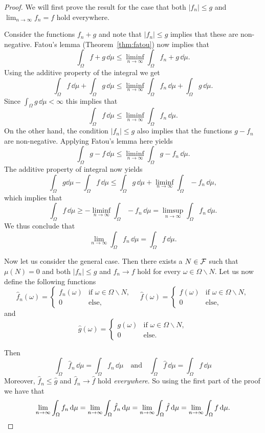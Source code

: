 \begin{proof}
We will first prove the result for the case that both $|f_n| \le g$ and $\lim_{n\to\infty} f_n =f$ hold everywhere.  

Consider the functions $f_n+g$ and note that $|f_n| \le g$ implies that these are non-negative. Fatou's lemma (Theorem~\ref{thm:fatou}) now implies that
\[
	\int_\Omega f + g \, \dd \mu \le \liminf_{n \to \infty} \int_\Omega f_n + g \, \dd \mu.
\] 
Using the additive property of the integral we get
\[
	\int_\Omega f \, \dd \mu + \int_\Omega g \, \dd \mu 
	\le \liminf_{n \to \infty} \int_\Omega f_n \, \dd \mu + \int_\Omega g \, \dd \mu.
\]
Since $\int_\Omega g \, \dd \mu < \infty$ this implies that
\[
	\int_\Omega f \, \dd \mu \le \liminf_{n \to \infty} \int_\Omega f_n \, \dd \mu.
\]
On the other hand, the condition $|f_n| \le g$ also implies that the functions $g - f_n$ are non-negative. Applying Fatou's lemma here yields
\[
	\int_\Omega g - f \, \dd \mu \le \liminf_{n \to \infty} \int_\Omega g - f_n \, \dd \mu.
\]
The additive property of integral now yields
\[
	\int_\Omega g \dd \mu - \int_\Omega f \, \dd \mu \le \int_\Omega g \, \dd \mu 
	+ \liminf_{n \to \infty} \int_\Omega - f_n \, \dd \mu,
\]
which implies that 
\[
	\int_\Omega f \, \dd \mu \ge - \liminf_{n \to \infty} \int_\Omega - f_n \, \dd \mu 
	= \limsup_{n \to \infty} \int_\Omega f_n \, \dd \mu.
\]
We thus conclude that
\[
	\lim_{n \to \infty} \int_\Omega f_n \, \dd \mu = \int_\Omega f \, \dd \mu.
\]

Now let us consider the general case. Then there exists a $N \in \mathcal F$ such that $\mu(N) = 0$ and both $|f_n| \le g$ and $f_n \to f$ hold for every $\omega \in \Omega \backslash N$. Let us now define the following functions
\[
	\hat{f}_n(\omega) = \begin{cases}
		f_n(\omega) &\text{if } \omega \in \Omega \backslash N,\\
		0 &\text{else,}
	\end{cases}
	\quad 
	\hat{f}(\omega) = \begin{cases}
		f(\omega) &\text{if } \omega \in \Omega \backslash N,\\
		0 &\text{else,}
	\end{cases}
\]
and
\[
	\hat{g}(\omega) = \begin{cases}
		g(\omega) &\text{if } \omega \in \Omega \backslash N,\\
		0 &\text{else.}
	\end{cases}
\]

Then 
\[
	\int_\Omega \hat{f}_n \, \dd \mu = \int_\Omega f_n \, \dd \mu \quad \text{and} \quad
	\int_\Omega \hat{f} \, \dd \mu = \int_\Omega f \, \dd \mu
\]
Moreover, $\hat{f}_n \le \hat{g}$ and $\hat{f}_n \to \hat{f}$ hold \emph{everywhere}. So using the first part of the proof we have that
\[
	\lim_{n \to \infty} \int_\Omega f_n \, \mathrm{d} \mu = \lim_{n \to \infty} \int_\Omega \hat{f}_n \, \mathrm{d} \mu
	= \lim_{n \to \infty} \int_\Omega \hat{f} \, \mathrm{d} \mu = \lim_{n \to \infty} \int_\Omega f \, \mathrm{d} \mu.\qedhere
\]
\end{proof}

